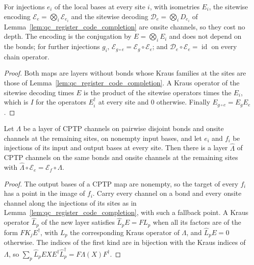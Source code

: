 \begin{lemma}
    \label{lem:qc_product_register_encoding}
    \leanok
    For injections $e_i$ of the local bases at every site $i$, with isometries $E_i$, the
    sitewise encoding $\mathcal E_e=\bigotimes_i\mathcal E_{e_i}$ and the sitewise decoding
    $\mathcal D_e=\bigotimes_iD_{e_i}$ of Lemma~\ref{lem:qc_register_code_completion} are onsite
    channels, so they cost no depth. The encoding is the conjugation by $E=\bigotimes_iE_i$ and
    does not depend on the bonds; for further injections $g_i$,
    $\mathcal E_{g\circ e}=\mathcal E_g\circ\mathcal E_e$; and
    $\mathcal D_e\circ\mathcal E_e=\operatorname{id}$ on every chain operator.
\end{lemma}
\begin{proof}
    \leanok
    Both maps are layers without bonds whose Kraus families at the sites are those of
    Lemma~\ref{lem:qc_register_code_completion}. A Kraus operator of the sitewise decoding times
    $E$ is the product of the sitewise operators times the $E_i$, which is $I$ for the operators
    $E_i^\dagger$ at every site and $0$ otherwise. Finally $E_{g\circ e}=E_gE_e$.
\end{proof}

\begin{lemma}
    \label{thm:qc_encode_native_channel_layer}
    \leanok
    Let $\Lambda$ be a layer of CPTP channels on pairwise disjoint bonds and onsite channels at
    the remaining sites, on nonempty input bases, and let $e_i$ and $f_i$ be injections of its
    input and output bases at every site. Then there is a layer $\widehat\Lambda$ of CPTP
    channels on the same bonds and onsite channels at the remaining sites with
    $\widehat\Lambda\circ\mathcal E_e=\mathcal E_f\circ\Lambda$.
\end{lemma}
\begin{proof}
    \leanok
    The output bases of a CPTP map are nonempty, so the target of every $f_i$ has a point in
    the image of $f_i$. Carry every channel on a bond and every onsite channel along the
    injections of its sites as in Lemma~\ref{lem:qc_register_code_completion}, with such a
    fallback point. A Kraus operator $\widehat L_p$ of the new layer satisfies
    $\widehat L_pE=FL_p$ when all its factors are of the form $FK_jE^\dagger$, with $L_p$ the
    corresponding Kraus operator of $\Lambda$, and $\widehat L_pE=0$ otherwise. The indices of
    the first kind are in bijection with the Kraus indices of $\Lambda$, so
    $\sum_p\widehat L_pEXE^\dagger\widehat L_p^\dagger=F\Lambda(X)F^\dagger$.
\end{proof}

